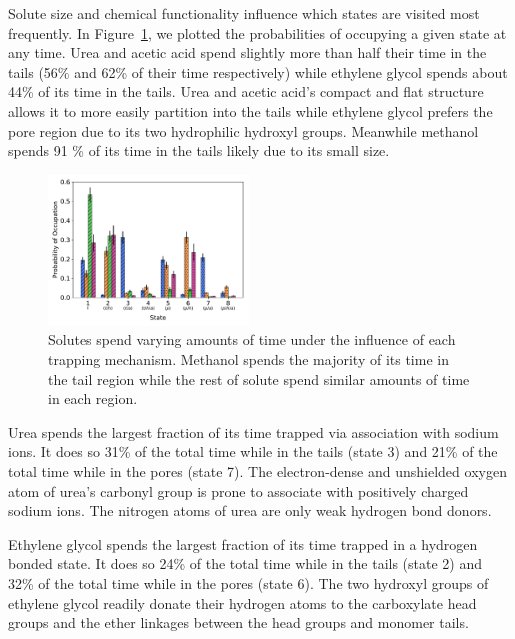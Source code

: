 \documentclass{article}
\begin{document}
  Solute size and chemical functionality influence which states are visited most frequently.
  In Figure~\ref{fig:state_probabilities}, we plotted the probabilities of occupying
  a given state at any time. Urea and acetic acid spend slightly more than half 
  their time in the tails (56\% and 62\% of their time respectively) while ethylene
  glycol spends about 44\% of its time in the tails. Urea and acetic acid's compact
  and flat structure allows it to more easily partition into the tails while ethylene
  glycol prefers the pore region due to its two hydrophilic hydroxyl groups. Meanwhile
  methanol spends 91 \% of its time in the tails likely due to its small size.
  
  \begin{figure}
  \centering
  \includegraphics[width=0.475\textwidth]{state_probabilities.pdf}
  \caption{Solutes spend varying amounts of time under the influence of each
  trapping mechanism. Methanol spends the majority of its time in the tail region
  while the rest of solute spend similar amounts of time in each region.}\label{fig:state_probabilities}
  \end{figure}
  
  Urea spends the largest fraction of its time trapped via association with sodium ions.
  It does so 31\% of the total time while in the tails (state 3) and 21\% of the
  total time while in the pores (state 7). The electron-dense and unshielded oxygen
  atom of urea's carbonyl group is prone to associate with positively charged sodium
  ions. The nitrogen atoms of urea are only weak hydrogen bond donors.
  
  Ethylene glycol spends the largest fraction of its time trapped in a hydrogen
  bonded state. It does so 24\% of the total time while in the tails (state 2)
  and 32\% of the total time while in the pores (state 6). The two hydroxyl groups 
  of ethylene glycol readily donate their hydrogen atoms to the carboxylate
  head groups and the ether linkages between the head groups and monomer tails. 
  
\end{document}
